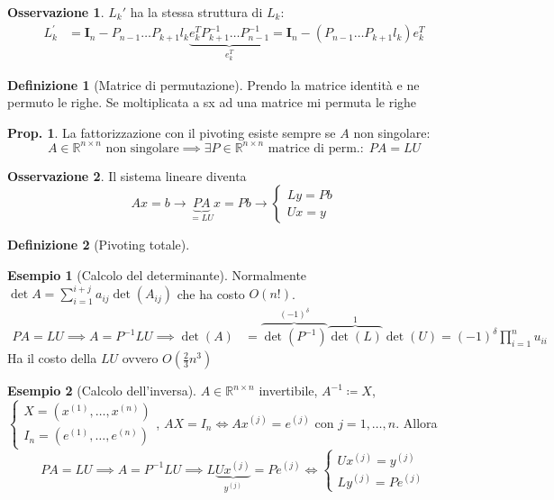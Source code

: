 \documentclass[a4paper,10pt]{article}
\theoremstyle{definition}
\newcommand{\re}{\mathbb{R}} %
\theoremstyle{indentdefinition}
\newtheorem{defn}{Definizione}[section]
\theoremstyle{indenttheorem}
\newtheorem{prop}{Prop.}
\theoremstyle{myremark}
\newtheorem*{rem*}{Osservazione}
\newtheorem{example*}{Esempio}
\theoremstyle{indentgeneral}
\theoremstyle{plain}
\theoremstyle{plain}
\begin{document}
\begin{rem*}
    $L_k'$ ha la stessa struttura di $L_k$:
    \begin{align*}
L_{k}^{\prime} & =\boldsymbol{I}_{n}-P_{n-1}\ldots P_{k+1}l_{k}\underset{e_{k}^{T}}{\underbrace{e_{k}^{T}P_{k+1}^{-1}\ldots P_{n-1}^{-1}}}=\boldsymbol{I}_{n}-\left(P_{n-1}\ldots P_{k+1}l_{k}\right)e_{k}^{T}
\end{align*}
\end{rem*}


\begin{defn}[Matrice di permutazione] Prendo la matrice identità e ne permuto le righe. Se moltiplicata a sx ad una matrice mi permuta le righe
\end{defn}


\begin{prop}
La fattorizzazione con il pivoting esiste sempre se $A$ non singolare:
$$A\in\re^{n\times n}\text{ non singolare}\implies\exists P\in\re^{n\times n}\text{ matrice di perm.}:\; PA=LU$$
\end{prop}

\begin{rem*}
    Il sistema lineare diventa
    $$Ax=b\longrightarrow \underbrace{PA}_{=LU}x=Pb\longrightarrow\begin{cases}
        Ly=Pb \\
        Ux=y
    \end{cases}$$
\end{rem*}

\begin{defn}[Pivoting totale]
    
\end{defn}

\begin{example*}[Calcolo del determinante] Normalmente $\det A=\sum_{i=1}^{i+j}a_{ij}\det(A_{ij})$ che ha costo $O(n!)$. 
\begin{align*}
PA=LU\implies A=P^{-1}LU \implies  \det\left(A\right) & =\overset{\left(-1\right)^{\delta}}{\overbrace{\det\left(P^{-1}\right)}}\overset{1}{\overbrace{\det\left(L\right)}}\det\left(U\right)=\left(-1\right)^{\delta}\prod_{i=1}^{n}u_{ii}
\end{align*}
Ha il costo della $LU$ ovvero $O(\frac{2}{3}n^3)$
\end{example*}

\begin{example*}[Calcolo dell'inversa] $A\in\re^{n\times n}$ invertibile, $A^{-1}\coloneqq X$, $\begin{cases}
    X=(x^{(1)},\dots,x^{(n)}) \\
    I_n=(e^{(1)},\dots,e^{(n)})
\end{cases}$, $AX=I_n\iff Ax^{(j)}=e^{(j)}$ con $j=1,\dots,n$. Allora
$$PA=LU\implies A=P^{-1}LU\implies L\underbrace{Ux^{(j)}}_{y^{(j)}}=Pe^{(j)}\iff\begin{cases}
    Ux^{(j)}=y^{(j)} \\
    Ly^{(j)}=Pe^{(j)} 
\end{cases}$$
\end{example*}
\end{document}
